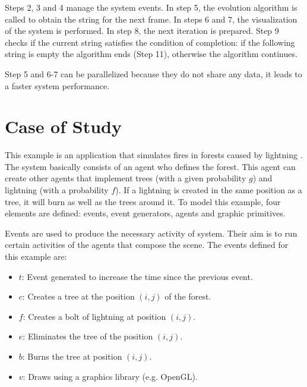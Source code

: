 \documentclass[runningheads]{llncs}
\begin{document}
Steps 2, 3 and 4 manage the system events. In step 5, the evolution algorithm is called to obtain the
string for the next frame. In steps 6 and 7, the visualization of the system is performed.
In step 8, the next iteration
is prepared. Step 9 checks if the current string satisfies the condition of completion: if the
following string is empty the algorithm ends (Step 11), otherwise the algorithm continues.

Step 5 and 6-7 can be parallelized because they do not share any data, it leads
to a faster system performance.



\section{Case of Study
\label{sec:case_study}}

This example is an application that simulates fires in forests caused by lightning \cite{John2007}.
The system basically consists of an agent who defines the forest. This agent
can create other agents that implement trees (with a given probability $g$)
and lightning (with a probability $f$). If a lightning is created in the same
position as a tree, it will burn as well as the trees around it.
To model this example, four elements are defined:
events, event generators, agents and graphic primitives.

Events are used to produce the necessary activity of system. Their aim is to run certain
activities of the agents that compose the scene. The events defined for this example are:

\begin{itemize}
    \item $t$: Event generated to increase the time since the previous event.

    \item $c$: Creates a tree at the position $(i, j)$ of the forest.

    \item $f$: Creates a bolt of lightning at position $(i, j)$.

    \item $e$: Eliminates the tree of the position $(i, j)$.

    \item $b$: Burns the tree at position $(i, j)$.

    \item $v$: Draws using a graphics library (e.g. OpenGL).
\end{itemize}
\end{document}
